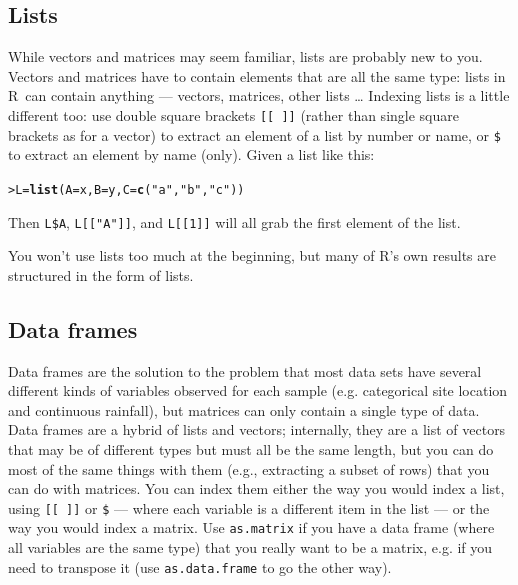 \documentclass[11pt]{article}\usepackage[]{graphicx}\usepackage[]{color}
\makeatletter
\newcommand{\hlstr}[1]{\textcolor[rgb]{0.192,0.494,0.8}{#1}}%
\newcommand{\hlstd}[1]{\textcolor[rgb]{0.345,0.345,0.345}{#1}}%
\newcommand{\hlkwb}[1]{\textcolor[rgb]{0.69,0.353,0.396}{#1}}%
\newcommand{\hlkwc}[1]{\textcolor[rgb]{0.333,0.667,0.333}{#1}}%
\newcommand{\hlkwd}[1]{\textcolor[rgb]{0.737,0.353,0.396}{\textbf{#1}}}%
\newenvironment{kframe}{%
 \def\at@end@of@kframe{}%
 \ifinner\ifhmode%
  \def\at@end@of@kframe{\end{minipage}}%
  \begin{minipage}{\columnwidth}%
 \fi\fi%
 \def\FrameCommand##1{\hskip\@totalleftmargin \hskip-\fboxsep
 \colorbox{shadecolor}{##1}\hskip-\fboxsep
     \hskip-\linewidth \hskip-\@totalleftmargin \hskip\columnwidth}%
 \MakeFramed {\advance\hsize-\width
   \@totalleftmargin\z@ \linewidth\hsize
   \@setminipage}}%
 {\par\unskip\endMakeFramed%
 \at@end@of@kframe}
\newenvironment{knitrout}{}{} %
\newcommand{\code}[1]{{\tt #1}}
\newcommand\R{{\sf R}}
\numberwithin{exercise}{section}
\makeatother
\begin{document}
\subsection{Lists}
While vectors and matrices may seem familiar,
lists are probably new to you.
Vectors and matrices have to contain elements that
are all the same type:
lists in \R\ can contain anything --- vectors, matrices,
other lists \ldots
Indexing lists is a little different too: use
double square brackets \code{[[ ]]} (rather
than single square brackets as for a vector)
to extract an element of a list by number or name, or
\verb+$+ to extract an element by name (only).
Given a list like this:
\begin{knitrout}
\color{fgcolor}\begin{kframe}
\begin{alltt}
\hlstd{> }\hlstd{L} \hlkwb{=} \hlkwd{list}\hlstd{(}\hlkwc{A} \hlstd{= x,} \hlkwc{B} \hlstd{= y,} \hlkwc{C} \hlstd{=} \hlkwd{c}\hlstd{(}\hlstr{"a"}\hlstd{,} \hlstr{"b"}\hlstd{,} \hlstr{"c"}\hlstd{))}
\end{alltt}
\end{kframe}
\end{knitrout}
\noindent Then \verb+L$A+, \verb+L[["A"]]+, and 
\verb+L[[1]]+ will all grab the first element
of the list.

You won't use lists too much at the beginning,
but many of R's own results are structured in
the form of lists.

\subsection{Data frames}
\label{sec:dataframes}

Data frames are the solution to the problem that most data sets have
several different kinds of variables observed for each sample
(e.g. categorical site location and continuous rainfall), but matrices
can only contain a single type of data.  Data frames are a hybrid of
lists and vectors; internally, they are a list of vectors that may be
of different types but must all be the same length, but you can do
most of the same things with them (e.g., extracting a subset of rows)
that you can do with matrices.  You can index them either the way you
would index a list, using \verb+[[ ]]+ or \verb+$+ --- where each
variable is a different item in the list --- or the way you would
index a matrix.  Use \code{as.matrix} if you have a data frame (where
all variables are the same type) that you really want to be a matrix,
e.g. if you need to transpose it (use \code{as.data.frame} to go the
other way).




\end{document}
